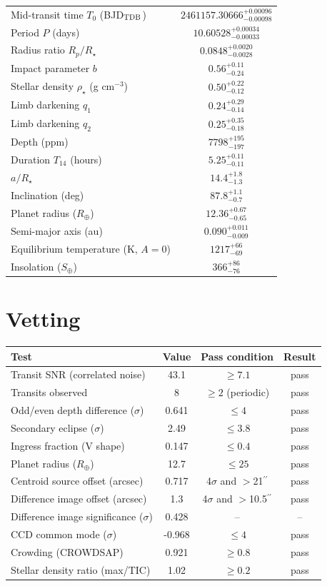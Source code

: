 \documentclass[11pt,a4paper]{article}
\newcommand{\arcsec}{$^{\prime\prime}$}
\begin{document}
\begin{tabular}{lc}\toprule
Mid-transit time $T_0$ (BJD$_{\rm TDB}$) & $2461157.30666^{+0.00096}_{-0.00098}$ \\
Period $P$ (days) & $10.60528^{+0.00034}_{-0.00033}$ \\
Radius ratio $R_p/R_\star$ & $0.0848^{+0.0020}_{-0.0028}$ \\
Impact parameter $b$ & $0.56^{+0.11}_{-0.24}$ \\
Stellar density $\rho_\star$ (g cm$^{-3}$) & $0.50^{+0.22}_{-0.12}$ \\
Limb darkening $q_1$ & $0.24^{+0.29}_{-0.14}$ \\
Limb darkening $q_2$ & $0.25^{+0.35}_{-0.18}$ \\
Depth (ppm) & $7798^{+195}_{-197}$ \\
Duration $T_{14}$ (hours) & $5.25^{+0.11}_{-0.11}$ \\
$a/R_\star$ & $14.4^{+1.8}_{-1.3}$ \\
Inclination (deg) & $87.8^{+1.1}_{-0.7}$ \\
Planet radius ($R_\oplus$) & $12.36^{+0.67}_{-0.65}$ \\
Semi-major axis (au) & $0.090^{+0.011}_{-0.009}$ \\
Equilibrium temperature (K, $A=0$) & $1217^{+66}_{-69}$ \\
Insolation ($S_\oplus$) & $366^{+86}_{-76}$ \\
\bottomrule\end{tabular}

\section*{Vetting}
\begin{tabular}{lccc}\toprule
Test & Value & Pass condition & Result \\\midrule
Transit SNR (correlated noise) & 43.1 & $\ge 7.1$ & pass \\
Transits observed & 8 & $\ge 2$ (periodic) & pass \\
Odd/even depth difference ($\sigma$) & 0.641 & $\le 4$ & pass \\
Secondary eclipse ($\sigma$) & 2.49 & $\le 3.8$ & pass \\
Ingress fraction (V shape) & 0.147 & $\le 0.4$ & pass \\
Planet radius ($R_\oplus$) & 12.7 & $\le 25$ & pass \\
Centroid source offset (arcsec) & 0.717 & 4$\sigma$ and $>$21\arcsec & pass \\
Difference image offset (arcsec) & 1.3 & 4$\sigma$ and $>$10.5\arcsec & pass \\
Difference image significance ($\sigma$) & 0.428 & -- & -- \\
CCD common mode ($\sigma$) & -0.968 & $\le 4$ & pass \\
Crowding (CROWDSAP) & 0.921 & $\ge 0.8$ & pass \\
Stellar density ratio (max/TIC) & 1.02 & $\ge 0.2$ & pass \\
\bottomrule\end{tabular}
\end{document}
